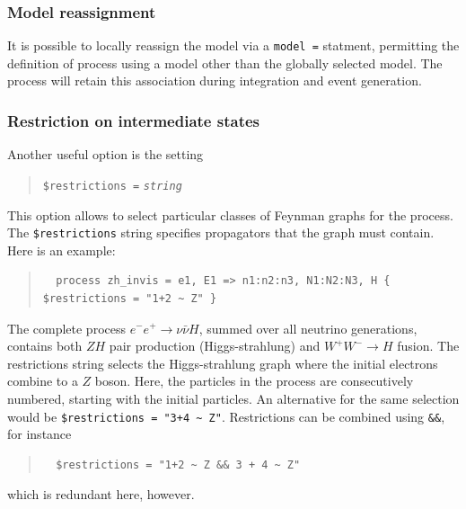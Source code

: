 \documentclass[12pt]{book}
\newcommand{\ttt}[1]{\texttt{#1}}
\begin{document}
\subsubsection{Model reassignment}

It is possible to locally reassign the model via a  \ttt{model =} statment,
permitting the definition of process using a model other than the globally
selected model. The process will retain this association during
integration and event generation.

\subsubsection{Restriction on intermediate states}

Another useful option is the setting
\begin{quote}
\begin{footnotesize}
  \verb|$restrictions =| \ttt{\textit{string}}
\end{footnotesize}
\end{quote}
This option allows to select particular classes of Feynman graphs for the
process.  The \verb|$restrictions| string specifies propagators that the graph
must contain.  Here is an example:
\begin{quote}
\begin{footnotesize}
\begin{verbatim}
  process zh_invis = e1, E1 => n1:n2:n3, N1:N2:N3, H { $restrictions = "1+2 ~ Z" }
\end{verbatim}
\end{footnotesize}
\end{quote}
The complete process $e^-e^+ \to \nu\bar\nu H$, summed over all neutrino
generations,  contains both $ZH$ pair production (Higgs-strahlung) and
$W^+W^-\to H$ fusion.  The restrictions string selects the Higgs-strahlung
graph where the initial electrons combine to a $Z$ boson.  Here, the particles
in the process are consecutively numbered, starting with the initial
particles.  An alternative for the same selection would be
\verb|$restrictions = "3+4 ~ Z"|.  Restrictions can be combined using
\verb|&&|, for instance
\begin{quote}
\begin{footnotesize}
\begin{verbatim}
  $restrictions = "1+2 ~ Z && 3 + 4 ~ Z"
\end{verbatim}
\end{footnotesize}
\end{quote}
which is redundant here, however.
\end{document}
